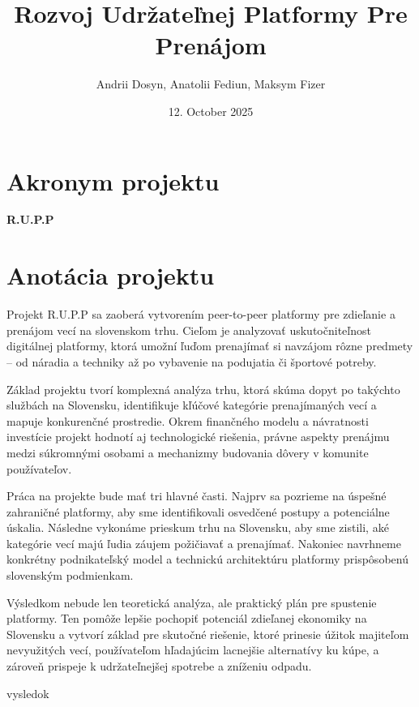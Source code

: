 \documentclass[12pt,twoside,slovak,a4paper]{article}
\title{\textbf{Rozvoj Udržateľnej Platformy Pre Prenájom}} %
\author{Andrii Dosyn, Anatolii Fediun, Maksym Fizer}
\date{\small 12. October 2025} %
\begin{document}
\maketitle

\section*{Akronym projektu}
\textbf{R.U.P.P }


\section*{Anotácia projektu}

Projekt R.U.P.P sa zaoberá vytvorením peer-to-peer platformy pre zdieľanie a prenájom vecí na slovenskom trhu. Cieľom je analyzovať uskutočniteľnost digitálnej platformy, ktorá umožní ľuďom prenajímať si navzájom rôzne predmety – od náradia a techniky až po vybavenie na podujatia či športové potreby. 

Základ projektu tvorí komplexná analýza trhu, ktorá skúma dopyt po takýchto službách na Slovensku, identifikuje kľúčové kategórie prenajímaných vecí a mapuje konkurenčné prostredie. Okrem finančného modelu a návratnosti investície projekt hodnotí aj technologické riešenia, právne aspekty prenájmu medzi súkromnými osobami a mechanizmy budovania dôvery v komunite používateľov.

Práca na projekte bude mať tri hlavné časti. Najprv sa pozrieme na úspešné zahraničné platformy, aby sme identifikovali osvedčené postupy a potenciálne úskalia. Následne vykonáme prieskum trhu na Slovensku, aby sme zistili, aké kategórie vecí majú ľudia záujem požičiavať a prenajímať. Nakoniec navrhneme konkrétny podnikateľský model a technickú architektúru platformy prispôsobenú slovenským podmienkam. 

Výsledkom nebude len teoretická analýza, ale praktický plán pre spustenie platformy. Ten pomôže lepšie pochopiť potenciál zdieľanej ekonomiky na Slovensku a vytvorí základ pre skutočné riešenie, ktoré prinesie úžitok majiteľom nevyužitých vecí, používateľom hľadajúcim lacnejšie alternatívy ku kúpe, a zároveň prispeje k udržateľnejšej spotrebe a zníženiu odpadu.

vysledok
\end{document}

